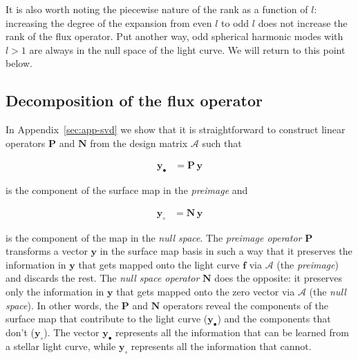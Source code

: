 \documentclass[modern,linenumbers]{aastex62}
\begin{document}
It is also worth noting the piecewise nature of the rank as a function of
$l$: increasing the degree of the expansion from even $l$ to odd $l$ does not
increase the rank of the flux operator. Put another way, odd spherical
harmonic modes with $l > 1$ are always in the null space of the light curve.
We will return to this point below.

\subsection{Decomposition of the flux operator}
%
\label{sec:svd}
%
In Appendix~\ref{sec:app-svd} we show that it is straightforward to
construct linear operators $\mathbf{P}$ and $\mathbf{N}$ from the
design matrix $\pmb{\mathcal{A}}$ such that
%
\begin{linenomath}\begin{align}
        \mathbf{y}_\bullet & = \mathbf{P} \, \mathbf{y}
    \end{align}\end{linenomath}
%
is the component of the surface map in the \emph{preimage} and
%
\begin{linenomath}\begin{align}
        \mathbf{y}_\circ & = \mathbf{N} \, \mathbf{y}
    \end{align}\end{linenomath}
%
is the component of the map in the \emph{null space}.
%
The \emph{preimage operator} $\mathbf{P}$
transforms a vector $\mathbf{y}$ in the surface map basis in such a way
that it preserves the information in $\mathbf{y}$ that gets mapped
onto the light curve $\mathbf{f}$ via $\pmb{\mathcal{A}}$ (the \emph{preimage}) and discards the rest. The
\emph{null space operator} $\mathbf{N}$ does the opposite: it preserves only
the information in $\mathbf{y}$ that gets mapped onto the zero
vector via $\pmb{\mathcal{A}}$ (the \emph{null space}).
%
In other words,
the $\mathbf{P}$ and $\mathbf{N}$ operators reveal the
components of the surface map that contribute to the
light curve ($\mathbf{y}_\bullet$) and the components that don't ($\mathbf{y}_\circ$).
The vector $\mathbf{y}_\bullet$ represents all the information that can be
learned from a stellar light curve, while $\mathbf{y}_\circ$ represents all the
information that cannot.
\end{document}
